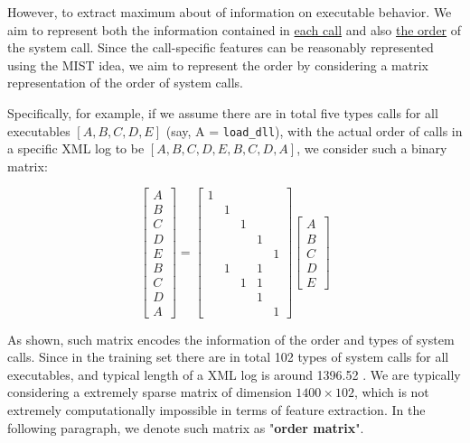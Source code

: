 \documentclass[11pt]{article}
\theoremstyle{definition}
\begin{document}
However, to extract maximum about of information on executable behavior. We aim to represent both the information contained in \underline{each call} and also \underline{the order} of the system call. Since the call-specific features can be reasonably represented using the MIST idea, we aim to represent the order by considering a matrix representation of the order of system calls. 

Specifically, for example, if we assume there are in total five types calls for all executables $[A, B, C, D, E]$ (say,  A = {\tt load\_dll}), with the actual order of calls in a specific XML log to be $[A, B, C, D, E, B, C, D, A]$, we consider such a binary matrix:

$$\begin{bmatrix}
A \\ B \\ C \\ D \\ E \\ B \\ C \\ D \\ A
\end{bmatrix}
=
\begin{bmatrix}
1 & & & & \\
 & 1 & & & \\
 & & 1 & & \\
 & & & 1 & \\
 & & &  & 1\\
 & 1 & & 1 & \\
 & & 1 & 1 & \\
 & & & 1 & \\
  & & &  & 1
\end{bmatrix}
\begin{bmatrix}
A \\ B \\ C \\ D \\ E
\end{bmatrix}
$$

As shown, such matrix encodes the information of the order and types of system calls. Since in the training set there are in total 102 types of system calls for all executables, and typical length of a XML log is around 1396.52
. We are typically considering a extremely sparse matrix of dimension $1400 \times 102$, which is not extremely computationally impossible in terms of feature extraction. In the following paragraph, we denote such matrix as "\textbf{order matrix}".
\end{document}
